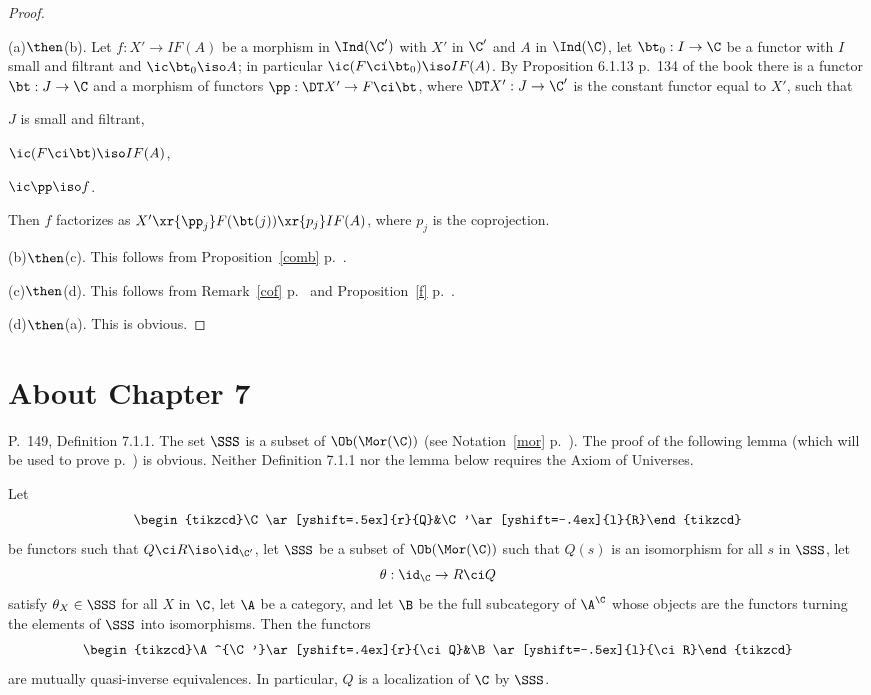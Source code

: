 \documentclass[12pt]{article}
\theoremstyle{remark}
\theoremstyle{definition}
\begin{document}
\begin{proof}\ 

\nn(a)$\then$(b). Let $f:X'\to IF(A)$ be a morphism in $\Ind(\C')$ with $X'$ in $\C'$ and $A$ in $\Ind(\C)$, let $\bt_0:I\to\C$ be a functor with $I$ small and filtrant and $\ic\bt_0\iso A$; in particular $\ic(F\ci\bt_0)\iso IF(A)$. By Proposition 6.1.13 p.~134 of the book there is a functor $\bt:J\to\C$ and a morphism of functors $\pp:\DT X'\to F\ci\bt$, where $\DT X':J\to\C'$ is the constant functor equal to $X'$, such that 

$J$ is small and filtrant, 

$\ic(F\ci\bt)\iso IF(A)$, 

$\ic\pp\iso f$. 

\nn Then $f$ factorizes as $X'\xr{\pp_j}F(\bt(j))\xr{p_j}IF(A)$, where $p_j$ is the coprojection.

\nn(b)$\then$(c). This follows from Proposition~\ref{comb} p.~. 

\nn(c)$\then$(d). This follows from Remark~\ref{cof} p.~ and Proposition~\ref{f} p.~. 

\nn(d)$\then$(a). This is obvious.
\end{proof}


\section{About Chapter 7}


\begin{s} 
P.~149, Definition 7.1.1. The set $\SSS$ is a subset of $\Ob(\Mor(\C))$ (see Notation~\ref{mor} p.~). The proof of the following lemma (which will be used to prove  p.~) is obvious. Neither Definition 7.1.1 nor the lemma below requires the Axiom of Universes.

\begin{lem}
Let 
$$
\begin{tikzcd}\C\ar[yshift=.5ex]{r}{Q}&\C'\ar[yshift=-.4ex]{l}{R}\end{tikzcd}
$$ 
be functors such that $Q\ci R\iso\id_{\C'}$, let $\SSS$ be a subset of $\Ob(\Mor(\C))$ such that $Q(s)$ is an isomorphism for all $s$ in $\SSS$, let 
$$
\theta:\id_\C\to R\ci Q
$$ 
satisfy $\theta_X\in\SSS$ for all $X$ in $\C$, let $\A$ be a category, and let $\B$ be the full subcategory of $\A^\C$ whose objects are the functors turning the elements of $\SSS$ into isomorphisms. Then the functors
$$
\begin{tikzcd}\A^{\C'}\ar[yshift=.4ex]{r}{\ci Q}&\B\ar[yshift=-.5ex]{l}{\ci R}\end{tikzcd}
$$
are mutually quasi-inverse equivalences. In particular, $Q$ is a localization of $\C$ by $\SSS$. 
\end{lem}
\end{s}
\end{document}

